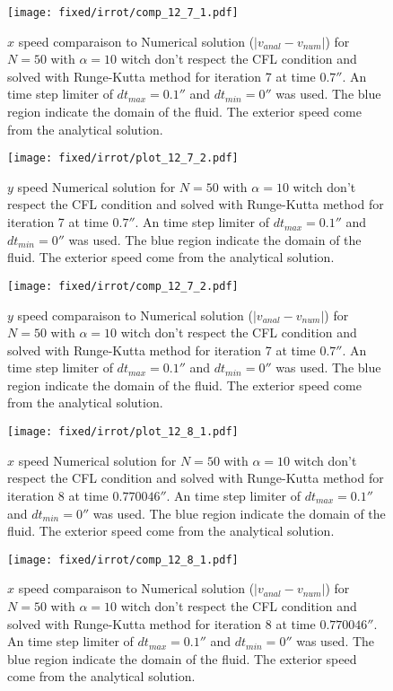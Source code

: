 \begin{figure}
\texttt{[image: fixed/irrot/comp\_12\_7\_1.pdf]}
\caption{$x$ speed comparaison to Numerical solution ($|v_{anal}-v_{num}|$) for $N=50$ with $\alpha=10$ witch don't respect the CFL condition and solved with Runge-Kutta method
for iteration 7 at time $\unit{0.7}{\second}$.
An time step limiter of $dt_{max}=\unit{0.1}{\second}$ and $dt_{min}=\unit{0}{\second}$ was used.
The blue region indicate the domain of the fluid. The exterior speed come from the analytical solution.
\label{fix:comp_12_7_1}
}
\end{figure}

\begin{figure}
\texttt{[image: fixed/irrot/plot\_12\_7\_2.pdf]}
\caption{$y$ speed Numerical solution for $N=50$ with $\alpha=10$ witch don't respect the CFL condition and solved with Runge-Kutta method
for iteration 7 at time $\unit{0.7}{\second}$.
An time step limiter of $dt_{max}=\unit{0.1}{\second}$ and $dt_{min}=\unit{0}{\second}$ was used.
The blue region indicate the domain of the fluid. The exterior speed come from the analytical solution.
\label{fix:plot_12_7_2}
}
\end{figure}

\begin{figure}
\texttt{[image: fixed/irrot/comp\_12\_7\_2.pdf]}
\caption{$y$ speed comparaison to Numerical solution ($|v_{anal}-v_{num}|$) for $N=50$ with $\alpha=10$ witch don't respect the CFL condition and solved with Runge-Kutta method
for iteration 7 at time $\unit{0.7}{\second}$.
An time step limiter of $dt_{max}=\unit{0.1}{\second}$ and $dt_{min}=\unit{0}{\second}$ was used.
The blue region indicate the domain of the fluid. The exterior speed come from the analytical solution.
\label{fix:comp_12_7_2}
}
\end{figure}

\begin{figure}
\texttt{[image: fixed/irrot/plot\_12\_8\_1.pdf]}
\caption{$x$ speed Numerical solution for $N=50$ with $\alpha=10$ witch don't respect the CFL condition and solved with Runge-Kutta method
for iteration 8 at time $\unit{0.770046}{\second}$.
An time step limiter of $dt_{max}=\unit{0.1}{\second}$ and $dt_{min}=\unit{0}{\second}$ was used.
The blue region indicate the domain of the fluid. The exterior speed come from the analytical solution.
\label{fix:plot_12_8_1}
}
\end{figure}

\begin{figure}
\texttt{[image: fixed/irrot/comp\_12\_8\_1.pdf]}
\caption{$x$ speed comparaison to Numerical solution ($|v_{anal}-v_{num}|$) for $N=50$ with $\alpha=10$ witch don't respect the CFL condition and solved with Runge-Kutta method
for iteration 8 at time $\unit{0.770046}{\second}$.
An time step limiter of $dt_{max}=\unit{0.1}{\second}$ and $dt_{min}=\unit{0}{\second}$ was used.
The blue region indicate the domain of the fluid. The exterior speed come from the analytical solution.
\label{fix:comp_12_8_1}
}
\end{figure}

